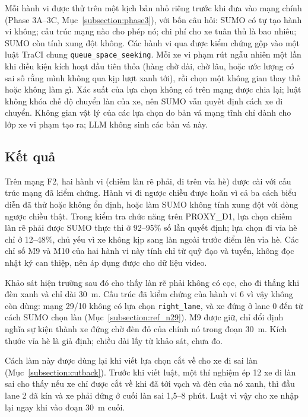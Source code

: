 \documentclass[../main.tex]{subfiles}
\begin{document}
Mỗi hành vi được thử trên một kịch bản nhỏ riêng trước khi đưa vào mạng chính (Phase 3A--3C, Mục~\ref{subsection:phase3}), với bốn câu hỏi: SUMO có tự tạo hành vi không; cấu trúc mạng nào cho phép nó; chi phí cho xe tuân thủ là bao nhiêu; SUMO còn tính xung đột không. Các hành vi qua được kiểm chứng gộp vào một luật TraCI chung \texttt{queue\_space\_seeking}. Mỗi xe vi phạm rút ngẫu nhiên một lần khi điều kiện kích hoạt đầu tiên thỏa (hàng chờ dài, chờ lâu, hoặc ước lượng có sai số rằng mình không qua kịp lượt xanh tới), rồi chọn một không gian thay thế hoặc không làm gì. Xác suất của lựa chọn không có trên mạng được chia lại; luật không khóa chế độ chuyển làn của xe, nên SUMO vẫn quyết định cách xe di chuyển. Không gian vật lý của các lựa chọn do bản vá mạng tĩnh chỉ dành cho lớp xe vi phạm tạo ra; LLM không sinh các bản vá này.

\subsection{Kết quả}

Trên mạng F2, hai hành vi (chiếm làn rẽ phải, đi trên vỉa hè) được cài với cấu trúc mạng đã kiểm chứng. Hành vi đi ngược chiều được hoãn vì cả ba cách biểu diễn đã thử hoặc không ổn định, hoặc làm SUMO không tính xung đột với dòng ngược chiều thật. Trong kiểm tra chức năng trên PROXY\_D1, lựa chọn chiếm làn rẽ phải được SUMO thực thi ở 92--95\% số lần quyết định; lựa chọn đi vỉa hè chỉ ở 12--48\%, chủ yếu vì xe không kịp sang làn ngoài trước điểm lên vỉa hè. Các chỉ số M9 và M10 của hai hành vi này tính chỉ từ quỹ đạo và tuyến, không đọc nhật ký can thiệp, nên áp dụng được cho dữ liệu video.

Khảo sát hiện trường sau đó cho thấy làn rẽ phải không có cọc, cho đi thẳng khi đèn xanh và chỉ dài 30~m. Cấu trúc đã kiểm chứng của hành vi 6 vì vậy không còn dùng: mạng 29/10 không có lựa chọn \texttt{right\_lane}, và xe đứng ở lane 0 đến từ cách SUMO chọn làn (Mục~\ref{subsection:ref_n29}). M9 được giữ, chỉ đổi định nghĩa sự kiện thành xe đứng chờ đèn đỏ của chính nó trong đoạn 30~m. Kích thước vỉa hè là giả định; chiều dài  lấy từ khảo sát, chưa đo.

Cách làm này được dùng lại khi viết lựa chọn cắt về cho xe đi sai làn (Mục~\ref{subsection:cutback}). Trước khi viết luật, một thí nghiệm ép 12 xe đi làn sai cho thấy nếu xe chỉ được cắt về khi đã tới vạch và đèn của nó xanh, thì đầu lane 2 đã kín và xe phải đứng ở cuối làn sai 1,5--8 phút. Luật vì vậy cho xe nhập lại ngay khi vào đoạn 30~m cuối.
\end{document}
